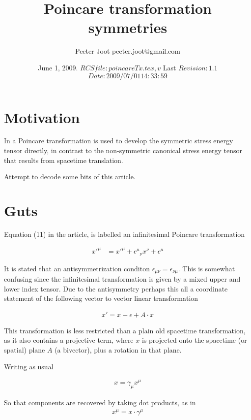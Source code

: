 \documentclass{article}
\title{Poincare transformation symmetries}
\author{Peeter Joot \quad peeter.joot@gmail.com }
\date{ June 1, 2009.  $RCSfile: poincareTx.tex,v $ Last $Revision: 1.1 $ $Date: 2009/07/01 14:33:59 $ }
\begin{document}
\maketitle{}
\tableofcontents
\section{Motivation}

In \cite{montesinos2006sem} a Poincare transformation is used to 
develop the symmetric stress energy tensor directly, in contrast to the
non-symmetric canonical stress energy tensor that results from 
spacetime translation.

Attempt to decode some bits of this article.

\section{Guts}

Equation (11) in the article, is labelled an infinitesimal Poincare
transformation

\begin{align}\label{eqn:txComponents}
{x'}^\mu
&=
{x'}^\mu
+ {{\epsilon}^\mu}_\nu x^\nu
+ {\epsilon}^\mu
\end{align}

It is stated that an antisymmetrization conditon $\epsilon_{\mu\nu} = \epsilon_{\nu\mu}$.  This is somewhat confusing 
since the infinitesimal transformation is given by a mixed upper and lower index tensor.   Due to the antisymmetry
perhaps this all a coordinate statement of the following vector to vector linear transformation

\begin{align}\label{eqn:blah}
x' = x + \epsilon + A \cdot x
\end{align}

This transformation is less restricted than a plain old spacetime transformation, as it also contains a projective term, where $x$ is projected onto the spacetime (or spatial) plane $A$ (a bivector), plus a rotation in that plane.

Writing as usual

\begin{align*}
x = \gamma_\mu x^\mu
\end{align*}

So that components are recovered by taking dot products, as in
\begin{align*}
x^\mu = x \cdot \gamma^\mu
\end{align*}
\end{document}

